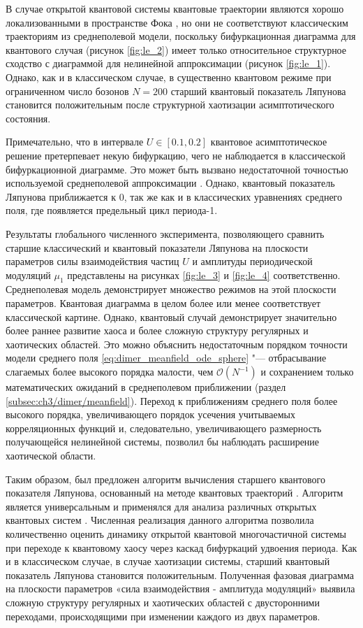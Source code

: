 В случае открытой квантовой системы квантовые траектории являются хорошо локализованными в пространстве Фока \cite{Yusipov2019_2}, но они не соответствуют классическим траекториям из среднеполевой модели, поскольку бифуркационная диаграмма для квантового случая (рисунок \cref{fig:le_2}) имеет только относительное структурное сходство с диаграммой для нелинейной аппроксимации (рисунок \cref{fig:le_1}).
Однако, как и в классическом случае, в существенно квантовом режиме при ограниченном число бозонов $N=200$ старший квантовый показатель Ляпунова становится положительным после структурной хаотизации асимптотического состояния.

Примечательно, что в интервале $U \in [0.1,0.2]$ квантовое асимптотическое решение претерпевает некую бифуркацию, чего не наблюдается в классической бифуркационной диаграмме. 
Это может быть вызвано недостаточной точностью используемой среднеполевой аппроксимации \cite{Ivanchenko2017}. 
Однако, квантовый показатель Ляпунова приближается к $0$, так же как и в классических уравнениях среднего поля, где появляется предельный цикл периода-1.

Результаты глобального численного эксперимента, позволяющего сравнить старшие классический и квантовый показатели Ляпунова на плоскости параметров силы взаимодействия частиц $U$ и амплитуды периодической модуляций $\mu_1$ представлены на рисунках  \cref{fig:le_3} и  \cref{fig:le_4} соответственно.
Среднеполевая модель демонстрирует множество режимов на этой плоскости параметров. 
Квантовая диаграмма в целом более или менее соответствует классической картине.
Однако, квантовый случай демонстрирует значительно более раннее развитие хаоса и более сложную структуру регулярных и хаотических областей.
Это можно объяснить недостаточным порядком точности модели среднего поля \cref{eq:dimer_meanfield_ode_sphere} "--- отбрасывание слагаемых более высокого порядка малости, чем $\mathcal{O}(N^{-1})$ и сохранением только математических ожиданий в среднеполевом приближении (раздел \cref{subsec:ch3/dimer/meanfield}). 
Переход к приближениям среднего поля более высокого порядка, увеличивающего порядок усечения учитываемых корреляционных функций и, следовательно, увеличивающего размерность получающейся нелинейной системы, позволил бы наблюдать расширение хаотической области.

Таким образом, был предложен алгоритм вычисления старшего квантового показателя Ляпунова, основанный на методе квантовых траекторий \cite{Yusipov2019_2}. 
Алгоритм является универсальным и применялся для анализа различных открытых квантовых систем \cite{Yusipov2019_2, Yusipov2020, Yusipov2021}.
Численная реализация \cite{prog1} данного алгоритма позволила количественно оценить динамику открытой квантовой многочастичной системы при переходе к квантовому хаосу через каскад бифуркаций удвоения периода. 
Как и в классическом случае, в случае хаотизации системы, старший квантовый показатель Ляпунова становится положительным.
Полученная фазовая диаграмма на плоскости параметров «сила взаимодействия - амплитуда модуляций» выявила сложную структуру регулярных и хаотических областей с двусторонними переходами, происходящими при изменении каждого из двух параметров. 

